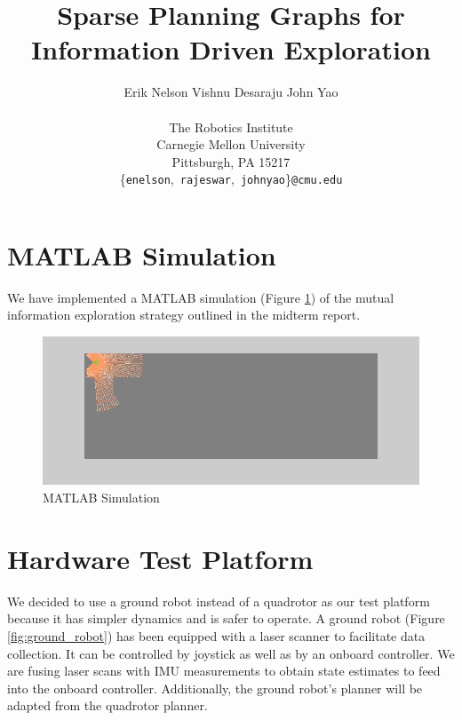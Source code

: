 \documentclass{article}
\begin{document}
\title{Sparse Planning Graphs for \\ Information Driven Exploration}


\date{}

\author{
  Erik Nelson \qquad Vishnu Desaraju \qquad John Yao \\
  \\
  \small The Robotics Institute \\
  \small Carnegie Mellon University \\
  \small Pittsburgh, PA 15217 \\
\small \{\texttt{enelson},\ \texttt{rajeswar},\ \texttt{johnyao}\}\texttt{@cmu.edu}}

\maketitle


\section{MATLAB Simulation}
We have implemented a MATLAB simulation (Figure \ref{fig:whiskerbotstart}) of the mutual information exploration strategy outlined in the midterm report.

\begin{figure}[!htbp]
\centering
\includegraphics[width=4.5in]{whiskerbotstart.png}
\caption{MATLAB Simulation}
\label{fig:whiskerbotstart}
\end{figure}

\section{Hardware Test Platform}
We decided to use a ground robot instead of a quadrotor as our test platform because it has simpler dynamics and is safer to operate.
A ground robot (Figure \ref{fig:ground_robot}) has been equipped with a laser scanner to facilitate data collection.
It can be controlled by joystick as well as by an onboard controller.
We are fusing laser scans with IMU measurements to obtain state estimates to feed into the onboard controller.
Additionally, the ground robot's planner will be adapted from the quadrotor planner.
\end{document}
